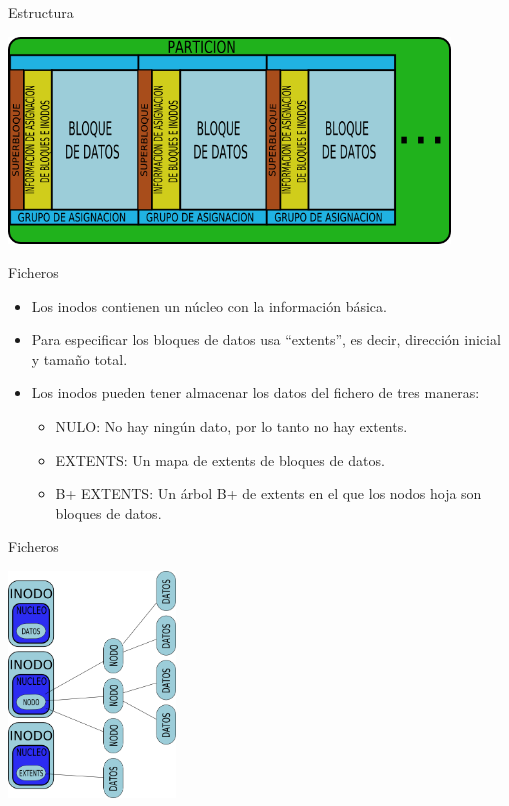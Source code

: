 \begin{frame}{Estructura}
  \begin{center}
    \includegraphics[height=5.5cm]{imgs/xfs_struct.png}
  \end{center}
\end{frame}

\begin{frame}{Ficheros}
  \begin{itemize}
    \item Los inodos contienen un núcleo con la información básica.
    \item Para especificar los bloques de datos usa “extents”, es decir, dirección inicial y tamaño total.
    \item Los inodos pueden tener almacenar los datos del fichero de tres maneras:
    \begin{itemize}
      \item NULO: No hay ningún dato, por lo tanto no hay extents.
      \item EXTENTS: Un mapa de extents de bloques de datos.
      \item B+ EXTENTS: Un árbol B+ de extents en el que los nodos hoja son bloques de datos.
    \end{itemize}
  \end{itemize}
\end{frame}

\begin{frame}{Ficheros}
  \begin{center}
    \includegraphics[height=6cm]{imgs/xfs_files.png}
  \end{center}
\end{frame}
